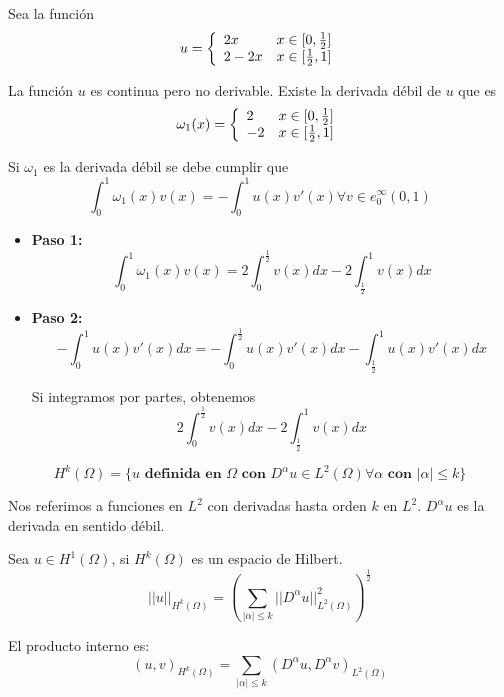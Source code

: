 \begin{example}
	Sea la función 
	\begin{equation*}
		u=\left\{
		\begin{array}{l l l}
			2x & x\in[0,\frac{1}{2}]\\
			2-2x & x\in [\frac{1}{2},1]
		\end{array}
		\right.
	\end{equation*}
	
	La función $u$ es continua pero no derivable. Existe la derivada débil de $u$ que es
	\begin{equation*}
		\omega_1(x)=\left\{
		\begin{array}{l l l}
			2 & x\in[0,\frac{1}{2}]\\
			-2 & x\in [\frac{1}{2},1]
		\end{array}
		\right.
	\end{equation*}
	
	Si $\omega_1$ es la derivada débil se debe cumplir que
	$$\int_0^1 \omega_1(x)v(x) = -\int_0^1u(x)v'(x) \forall v\in e_0^\infty (0,1)$$
	
	\begin{itemize}
		\item \textbf{Paso 1:}
		$$\int_0^1\omega_1(x)v(x) = 2\int_0^\frac{1}{2} v(x)dx-2\int_\frac{1}{2}^1v(x)dx$$
		\item \textbf{Paso 2:}
		$$-\int_0^1u(x)v'(x)dx = -\int_0^\frac{1}{2}u(x)v'(x)dx -\int_\frac{1}{2}^1 u(x)v'(x)dx$$
		
		Si integramos por partes, obtenemos $$2\int_0^\frac{1}{2} v(x)dx-2\int_\frac{1}{2}^1v(x)dx$$
	\end{itemize}
\end{example}

\begin{defn}
	$$H^k(\Omega) = \{u \textbf{ definida en }\Omega \textbf{ con } D^\alpha u\in L^2(\Omega)\forall \alpha \textbf{ con }|\alpha|\le k\}$$
	
	Nos referimos a funciones en $L^2$ con derivadas hasta orden $k$ en $L^2$. $D^\alpha u$ es la derivada en sentido débil.
\end{defn}

	Sea $u\in H^1(\Omega)$, si $H^k(\Omega)$ es un espacio de Hilbert.
	$$||u||_{H^k(\Omega)} = (\sum_{|\alpha|\le k}||D^\alpha u||_{L^2(\Omega)}^2)^\frac{1}{2}$$
	
	El producto interno es:
	$$(u,v)_{H^k(\Omega)} = \sum_{|\alpha|\le k}(D^\alpha u, D^\alpha v)_{L^2(\Omega)}$$
	

